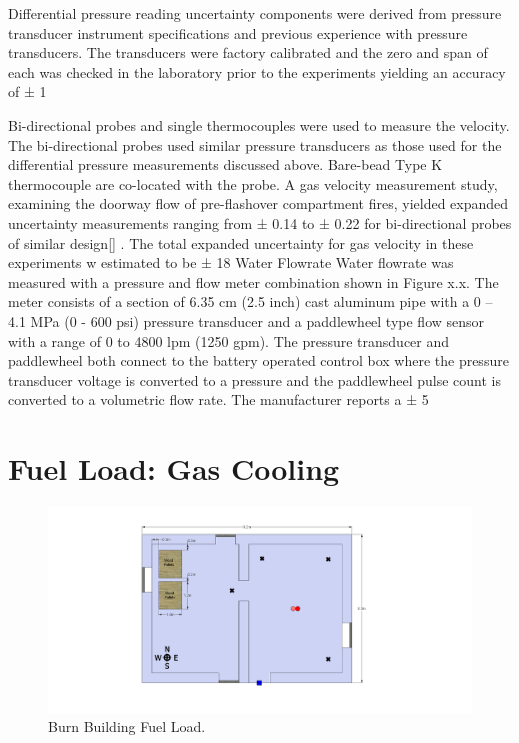 \documentclass[12pt,oneside]{book}
\begin{document}
Differential pressure reading uncertainty components were derived from pressure transducer
instrument specifications and previous experience with pressure transducers. The transducers
were factory calibrated and the zero and span of each was checked in the laboratory prior to the
experiments yielding an accuracy of ± 1 %

Bi-directional probes and single thermocouples were used to measure the velocity.  The bi-directional probes used similar pressure transducers as those used for the differential pressure measurements discussed above.   Bare-bead Type K thermocouple are co-located with the probe. A gas velocity measurement study, examining the doorway flow of pre-flashover compartment fires, yielded expanded uncertainty measurements ranging from ± 0.14 to ± 0.22 for bi-directional probes of similar design[] .  The total expanded uncertainty for gas velocity in these experiments w estimated to be  ± 18 %
Water Flowrate
Water flowrate was measured with a pressure and flow meter combination shown in Figure x.x. The meter consists of a section of 6.35 cm (2.5 inch) cast aluminum pipe with a 0 – 4.1 MPa (0 - 600 psi) pressure transducer and a paddlewheel type flow sensor with a range of 0 to 4800 lpm (1250 gpm). The pressure transducer and paddlewheel both connect to the battery operated control box where the pressure transducer voltage is converted to a pressure and the paddlewheel pulse count is converted to a volumetric flow rate.  The manufacturer reports a ± 5 %


\section{Fuel Load: Gas Cooling}
\label{sec:Fuel_Load:_Gas_Cooling} 

\begin{figure}[!ht]
	\includegraphics[width=6in]{../Figures/Pictures/DelCoBurnBuildingFuelLoad}
	\caption{Burn Building Fuel Load.}
	\label{fig:Burn_Building_Fuel_Load}
\end{figure}
\end{document}
